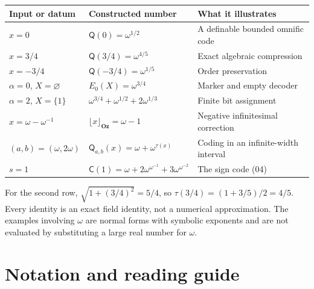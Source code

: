 \documentclass[11pt,a4paper]{article}
\numberwithin{equation}{section}
\theoremstyle{definition}
\theoremstyle{remark}
\newcommand{\Oz}{\mathbf{Oz}}
\newcommand{\Code}{\mathsf C}
\newcommand{\Mc}{\mathsf Q}
\begin{document}
\begin{center}
\renewcommand{\arraystretch}{1.25}
\begin{tabular}{@{}lll@{}}
\toprule
Input or datum & Constructed number & What it illustrates\\
\midrule
$x=0$ & $\Mc(0)=\omega^{1/2}$ & A definable bounded omnific code\\
$x=3/4$ & $\Mc(3/4)=\omega^{4/5}$ & Exact algebraic compression\\
$x=-3/4$ & $\Mc(-3/4)=\omega^{1/5}$ & Order preservation\\
$\alpha=0$, $X=\varnothing$ & $E_0(X)=\omega^{3/4}$ & Marker and empty decoder\\
$\alpha=2$, $X=\{1\}$ & $\omega^{3/4}+\omega^{1/2}+2\omega^{1/3}$ & Finite bit assignment\\
$x=\omega-\omega^{-1}$ & $\lfloor x\rfloor_{\Oz}=\omega-1$ & Negative infinitesimal correction\\
$(a,b)=(\omega,2\omega)$ & $\Mc_{a,b}(x)=\omega+\omega^{\tau(x)}$ & Coding in an infinite-width interval\\
$s=1$ & $\Code(1)=\omega+2\omega^{\omega^{-1}}+3\omega^{\omega^{-2}}$ & The sign code (04)\\
\bottomrule
\end{tabular}
\end{center}

For the second row, $\sqrt{1+(3/4)^2}=5/4$, so $\tau(3/4)=(1+3/5)/2=4/5$.
Every identity is an exact field identity, not a numerical approximation.
The examples involving $\omega$ are normal forms with symbolic exponents
and are not evaluated by substituting a large real number for $\omega$.

\section{Notation and reading guide}
\end{document}
